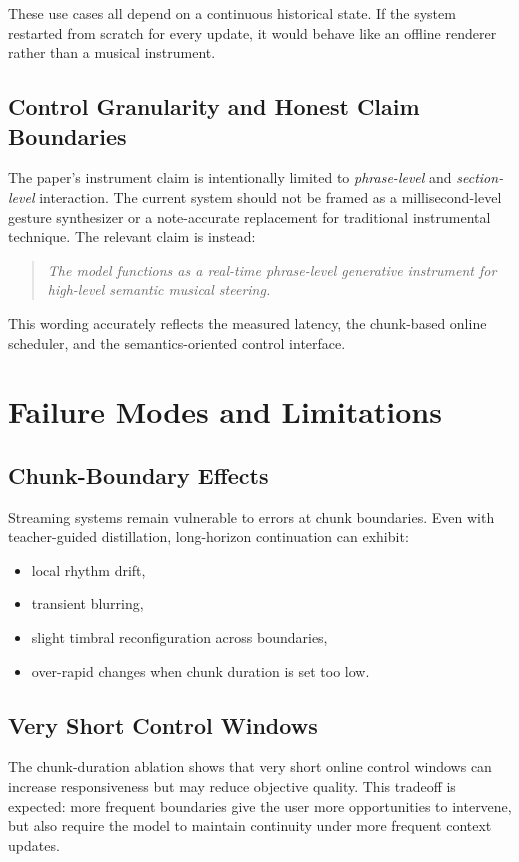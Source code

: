 \documentclass[11pt]{article}
\begin{document}
These use cases all depend on a continuous historical state. If the system restarted from scratch for every update, it would behave like an offline renderer rather than a musical instrument.

\subsection{Control Granularity and Honest Claim Boundaries}

The paper's instrument claim is intentionally limited to \emph{phrase-level} and \emph{section-level} interaction. The current system should not be framed as a millisecond-level gesture synthesizer or a note-accurate replacement for traditional instrumental technique. The relevant claim is instead:
\begin{quote}
\emph{The model functions as a real-time phrase-level generative instrument for high-level semantic musical steering.}
\end{quote}

This wording accurately reflects the measured latency, the chunk-based online scheduler, and the semantics-oriented control interface.

\section{Failure Modes and Limitations}

\subsection{Chunk-Boundary Effects}

Streaming systems remain vulnerable to errors at chunk boundaries. Even with teacher-guided distillation, long-horizon continuation can exhibit:
\begin{itemize}
    \item local rhythm drift,
    \item transient blurring,
    \item slight timbral reconfiguration across boundaries,
    \item over-rapid changes when chunk duration is set too low.
\end{itemize}

\subsection{Very Short Control Windows}

The chunk-duration ablation shows that very short online control windows can increase responsiveness but may reduce objective quality. This tradeoff is expected: more frequent boundaries give the user more opportunities to intervene, but also require the model to maintain continuity under more frequent context updates.
\end{document}
